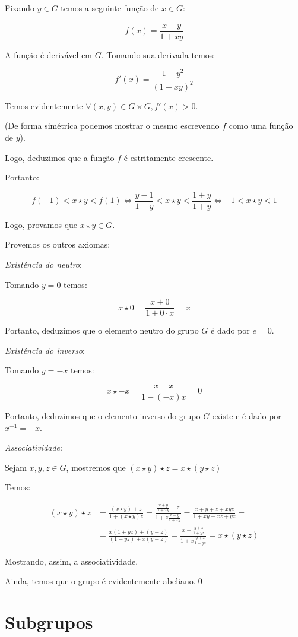 \documentclass[16pt,openany]{book}
\theoremstyle{definition}
\begin{document}
Fixando $y \in G$ temos a seguinte função de $x \in G$:

\[
f(x) = \frac{x + y}{1 + xy}
\]

A função é derivável em $G$. Tomando sua derivada temos:

\[
f'(x) = \frac{1 - y^2}{(1+xy)^2} 
\]

Temos evidentemente $\forall (x, y) \in G \times G, f'(x) > 0$.

(De forma simétrica podemos mostrar o mesmo escrevendo $f$ como uma função de $y$).

Logo, deduzimos que a função $f$ é estritamente crescente.

Portanto:

\[
f(-1)<x \star y < f(1) \iff \frac{y-1}{1-y} < x \star y < \frac{1+y}{1+y} \iff -1 <x\star y < 1
\]

Logo, provamos que $x\star y \in G$.

Provemos os outros axiomas:

\textit{Existência do neutro}:

Tomando $y = 0$ temos:

\[
x\star 0 = \frac{x + 0}{1 + 0\cdot x} = x
\]

Portanto, deduzimos que o elemento neutro do grupo $G$ é dado por $e = 0$.

\textit{Existência do inverso}:

Tomando $y = -x$ temos:

\[
x\star -x = \frac{x -x}{1 - (-x)x} = 0
\]

Portanto, deduzimos que o elemento inverso do grupo $G$ existe e é dado por $x^{-1} = -x$.

\textit{Associatividade}:

Sejam $x, y, z \in G$, mostremos que $(x\star y)\star z = x\star (y\star z)$

Temos:

\begin{align*}
(x\star y)\star z &= \frac{(x\star y) + z}{1+(x\star y)z} = \frac{\frac{x+y}{1+xy} + z}{1 + z\frac{x+y}{1 +xy}} = \frac{x + y+z+xyz}{1+xy+xz+yz} = \\[10pt]
&= \frac{x(1+yz) + (y +z)}{(1+yz)+x(y+z)} = \frac{x+\frac{y+z}{1+yz}}{1+x\frac{y+z}{1+yz}} = x\star (y\star z)
\end{align*}

Mostrando, assim, a associatividade.

Ainda, temos que o grupo é evidentemente abeliano.\qed

\section{Subgrupos}
\end{document}
